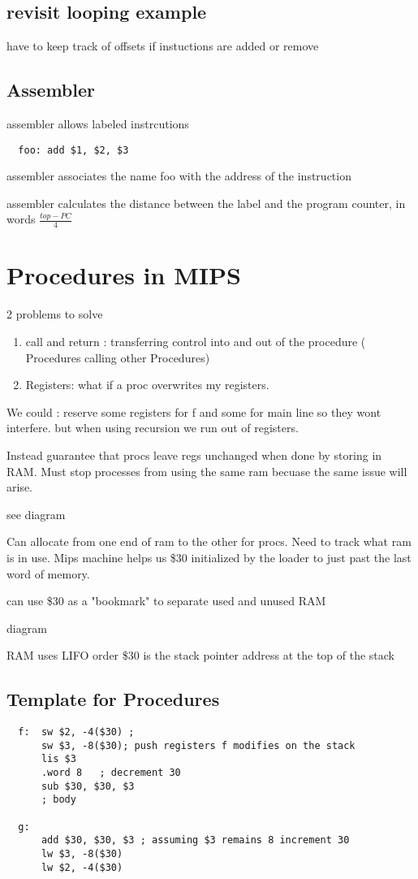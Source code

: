 \documentclass[11pt]{amsart}
\begin{document}
\subsection{revisit looping example}
\par have to keep track of offsets if instuctions are added or remove
\subsection{Assembler}
\par assembler allows labeled instrcutions
\begin{verbatim}
  foo: add $1, $2, $3
\end{verbatim}
\par assembler associates the name foo with the address of the instruction
\par assembler calculates the distance between the label and the program
counter, in words $\frac{top-PC}{4}$
\section{Procedures in MIPS}
\par 2 problems to solve
\begin{enumerate}
  \item call and return : transferring control into and out of the procedure (
    Procedures calling other Procedures)
  \item Registers: what if a proc overwrites my registers.
\end{enumerate}
\par We could : reserve some registers for f and some for main line so they
wont interfere. but when using recursion we run out of registers.
\par Instead guarantee that procs leave regs unchanged when done by storing in
RAM. Must stop processes from using the same ram becuase the same issue will
arise.
\par see diagram
\par Can allocate from one end of ram to the other for procs. Need to track what
ram is in use. Mips machine helps us \$30 initialized by the loader to just
past the last word of memory.
\par can use \$30 as a "bookmark" to separate used and unused RAM
\par diagram
\par RAM uses LIFO order \$30 is the stack pointer address at the top of the
stack
\subsection{Template for Procedures}
\begin{verbatim}
  f:  sw $2, -4($30) ;
      sw $3, -8($30); push registers f modifies on the stack
      lis $3
      .word 8   ; decrement 30
      sub $30, $30, $3
      ; body

  g:
      add $30, $30, $3 ; assuming $3 remains 8 increment 30
      lw $3, -8($30)
      lw $2, -4($30)

\end{verbatim}
\end{document}
